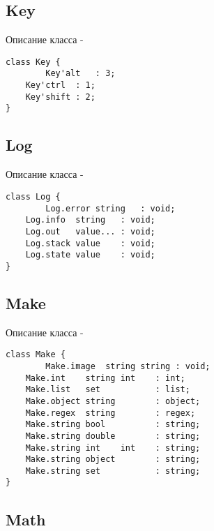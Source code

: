 \subsection{{\color{orange} Key}}

\noindent Описание класса  -
\begin{lstlisting}[numbers=none]
class Key {
        Key'alt   : 3;
	Key'ctrl  : 1;
	Key'shift : 2;
}
\end{lstlisting}

\subsection{{\color{orange} Log}}

\noindent Описание класса  -
\begin{lstlisting}[numbers=none]
class Log {
        Log.error string   : void;
	Log.info  string   : void;
	Log.out   value... : void;
	Log.stack value    : void;
	Log.state value    : void;
}
\end{lstlisting}

\subsection{{\color{orange} Make}}

\noindent Описание класса  -
\begin{lstlisting}[numbers=none]
class Make {
        Make.image  string string : void;
	Make.int    string int    : int;
	Make.list   set           : list;
	Make.object string        : object;
	Make.regex  string        : regex;
	Make.string bool          : string;
	Make.string double        : string;
	Make.string int    int    : string;
	Make.string object        : string;
	Make.string set           : string;
}
\end{lstlisting}

\subsection{{\color{orange} Math}}

